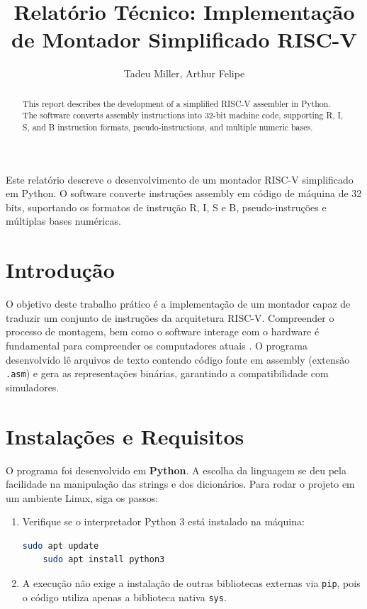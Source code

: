 \documentclass[12pt]{article}
\title{Relatório Técnico: Implementação de Montador Simplificado RISC-V}
\author{Tadeu Miller, Arthur Felipe}
\begin{document}
 

\maketitle

\begin{abstract}
  This report describes the development of a simplified RISC-V assembler 
  in Python. The software converts assembly instructions into 32-bit machine 
  code, supporting R, I, S, and B instruction formats, pseudo-instructions, 
  and multiple numeric bases.
\end{abstract}

\begin{resumo}
  Este relatório descreve o desenvolvimento de um montador RISC-V 
  simplificado em Python. O software converte instruções assembly em código 
  de máquina de 32 bits, suportando os formatos de instrução R, I, S e B, 
  pseudo-instruções e múltiplas bases numéricas.
\end{resumo}

\section{Introdução}
O objetivo deste trabalho prático é a implementação de um montador capaz de traduzir um conjunto de instruções da arquitetura RISC-V. Compreender o processo de montagem, bem como o software interage com o hardware é fundamental para compreender os computadores atuais \cite{patterson_hennessy}. O programa desenvolvido lê arquivos de texto contendo código fonte em assembly (extensão \texttt{.asm}) e gera as representações binárias, garantindo a compatibilidade com simuladores.

\section{Instalações e Requisitos}
O programa foi desenvolvido em \textbf{Python}. A escolha da linguagem se deu pela facilidade na manipulação das strings e dos dicionários. Para rodar o projeto em um ambiente Linux, siga os passos:

\begin{enumerate}
    \item Verifique se o interpretador Python 3 está instalado na máquina:
    \begin{lstlisting}[language=bash]
    sudo apt update
    sudo apt install python3
    \end{lstlisting}
    \item A execução não exige a instalação de outras bibliotecas externas via \texttt{pip}, pois o código utiliza apenas a biblioteca nativa \texttt{sys}.
\end{enumerate}
\end{document}
